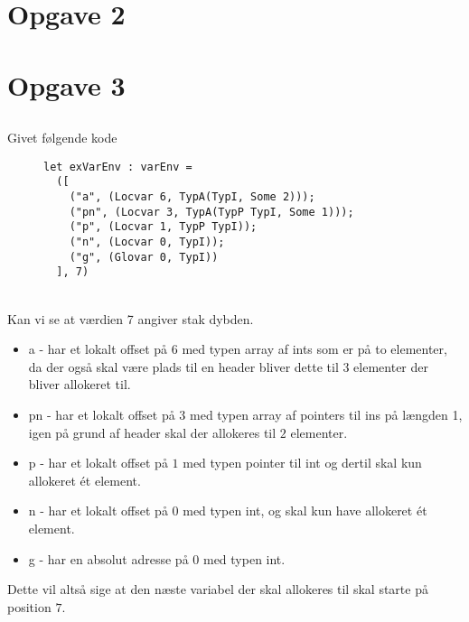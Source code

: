\documentclass[11pt,a4paper]{article}
\begin{document}
\section{Opgave 2}
\begin{mathpar}
\end{mathpar}
\section{Opgave 3}
\subsection{}
Givet følgende kode
\begin{figure}[!ht]\label{fig:exVarEnv}
\begin{verbatim}
let exVarEnv : varEnv = 
  ([
    ("a", (Locvar 6, TypA(TypI, Some 2)));
    ("pn", (Locvar 3, TypA(TypP TypI, Some 1)));
    ("p", (Locvar 1, TypP TypI));
    ("n", (Locvar 0, TypI));
    ("g", (Glovar 0, TypI))
  ], 7)
\end{verbatim} 
  \caption{}
\end{figure}\\
Kan vi se at værdien 7 angiver stak dybden. 
\begin{itemize}
  \item a - har et lokalt offset på $6$ med typen array af ints som er på to elementer, da der også skal være plads til en header bliver dette til $3$ elementer der bliver allokeret til.
  \item pn - har et lokalt offset på $3$ med typen array af pointers til ins på længden 1, igen på grund af header skal der allokeres til $2$ elementer.
  \item p - har et lokalt offset på $1$ med typen pointer til int og dertil skal kun allokeret ét element.
  \item n - har et lokalt offset på $0$ med typen int, og skal kun have allokeret ét element.
  \item g - har en absolut adresse på $0$ med typen int.
\end{itemize}
Dette vil altså sige at den næste variabel der skal allokeres til skal starte på position $7$.
\end{document}
